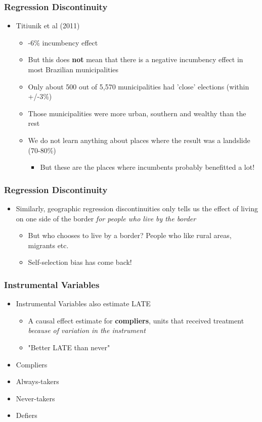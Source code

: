 \documentclass[xcolor=x11names,compress]{beamer}\usepackage[]{graphicx}\usepackage[]{color}
\renewcommand{\(}{\begin{columns}}
\renewcommand{\)}{\end{columns}}
\newcommand{\<}[1]{\begin{column}{#1}}
\renewcommand{\>}{\end{column}}
\begin{document}
\begin{frame}
\frametitle{Regression Discontinuity}
\begin{itemize}
\item Titiunik et al (2011) 
\pause
\begin{itemize}
\item -6\% incumbency effect
\pause
\item But this does \textbf{not} mean that there is a negative incumbency effect in most Brazilian municipalities
\pause
\item Only about 500 out of 5,570 municipalities had 'close' elections (within +/-3\%)
\pause
\item Those municipalities were more urban, southern and wealthy than the rest
\pause
\item We do not learn anything about places where the result was a landslide (70-80\%)
\pause
\begin{itemize}
\item But these are the places where incumbents probably benefitted a lot!
\end{itemize}
\end{itemize}
\end{itemize}
\end{frame}

\begin{frame}
\frametitle{Regression Discontinuity}
\begin{itemize}
\item Similarly, geographic regression discontinuities only tells us the effect of living on one side of the border \textit{for people who live by the border}
\pause
\begin{itemize}
\item But who chooses to live by a border? People who like rural areas, migrants etc.
\pause
\item Self-selection bias has come back!
\end{itemize}
\end{itemize}
\end{frame}

\begin{frame}
\frametitle{Instrumental Variables}
\begin{itemize}
\item Instrumental Variables also estimate LATE
\begin{itemize}
\item A causal effect estimate for \textbf{compliers}, units that received treatment \textit{because of variation in the instrument}
\item "Better LATE than never"
\end{itemize}
\item Compliers
\item Always-takers
\item Never-takers
\item Defiers
\end{itemize}
\end{frame}
\end{document}
